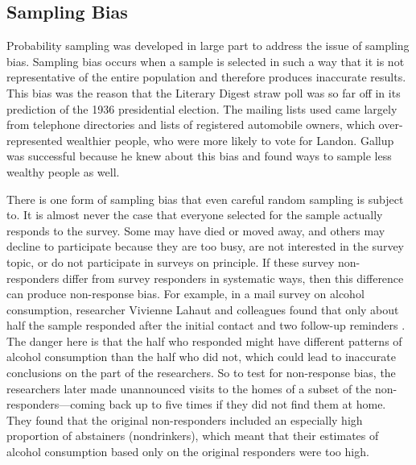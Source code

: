 \subsection{Sampling Bias}

Probability sampling was developed in large part to address the issue of sampling bias. Sampling bias occurs when a sample is selected in such a way that it is not representative of the entire population and therefore produces inaccurate results. This bias was the reason that the Literary Digest straw poll was so far off in its prediction of the 1936 presidential election. The mailing lists used came largely from telephone directories and lists of registered automobile owners, which over-represented wealthier people, who were more likely to vote for Landon. Gallup was successful because he knew about this bias and found ways to sample less wealthy people as well.

There is one form of sampling bias that even careful random sampling is subject to. It is almost never the case that everyone selected for the sample actually responds to the survey. Some may have died or moved away, and others may decline to participate because they are too busy, are not interested in the survey topic, or do not participate in surveys on principle. If these survey non-responders differ from survey responders in systematic ways, then this difference can produce non-response bias. For example, in a mail survey on alcohol consumption, researcher Vivienne Lahaut and colleagues found that only about half the sample responded after the initial contact and two follow-up reminders \citep{lahaut_non-response_2002}. The danger here is that the half who responded might have different patterns of alcohol consumption than the half who did not, which could lead to inaccurate conclusions on the part of the researchers. So to test for non-response bias, the researchers later made unannounced visits to the homes of a subset of the non-responders---coming back up to five times if they did not find them at home. They found that the original non-responders included an especially high proportion of abstainers (nondrinkers), which meant that their estimates of alcohol consumption based only on the original responders were too high.

